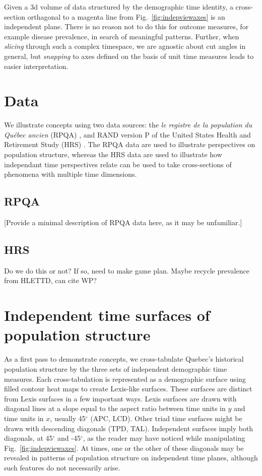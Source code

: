 Given a 3d volume of data structured by the demographic time identity, a cross-section orthagonal to a magenta line from Fig.~\ref{fig:indepviewaxes} is an independent plane. There is no reason not to do this for outcome measures, for example disease prevalence, in search of meaningful patterns. Further, when \emph{slicing} through such a complex timespace, we are agnostic about cut angles in general, but \emph{snapping} to axes defined on the basis of unit time measures leads to easier interpretation.

\section{Data}
We illustrate concepts using two data sources: the \emph{le registre de la population du Qu\'{e}bec ancien} (RPQA) \citep{desjardins1998}, and RAND version P of the United States Health and Retirement Study (HRS) \citep{HRS, RAND}. The RPQA data are used to illustrate perspectives on population structure, whereas the HRS data are used to illustrate how independant time perspectives
relate can be used to take cross-sections of phenomena with multiple time dimensions.

\subsection{RPQA}
[Provide a minimal description of RPQA data here, as it may be unfamiliar.]

\subsection{HRS}
Do we do this or not? If so, need to make game plan. Maybe recycle prevalence from HLETTD, can cite WP?

\section{Independent time surfaces of population structure}
As a first pass to demonstrate concepts, we cross-tabulate Quebec's historical population structure by the three sets of independent demographic time measures. Each cross-tabulation is represented as a demographic surface using filled contour heat maps to create Lexis-like surfaces. These surfaces are distinct from Lexis surfaces in a few important ways. Lexis surfaces are drawn with diagonal lines at a slope equal to the aspect ratio between time units in $y$ and time units in $x$, usually 45$^\circ$ (APC, LCD). Other triad time surfaces might be drawn with descending diagonals (TPD, TAL). Independent surfaces imply both diagonals, at 45$^\circ$ and -45$^\circ$, as the reader may have
noticed while manipulating Fig.~\ref{fig:indepviewaxes}. At times, one or the other of these diagonals may be revealed in patterns of population structure on independent time planes, although such features do not necessarily arise. 

